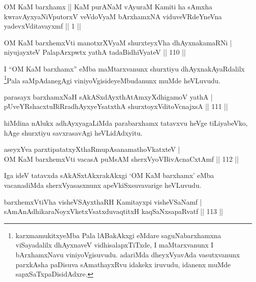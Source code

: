 \begin{shl}
OM KaM barxhamx || KaM purANaM vAyuraM Kamiti ha sAmxha kwravAyxyaNiVputorxV veVdoV\s yaM bArxhamxNA viduveVRdeYneVna yadevxVditavayxmf || 1 ||
\end{shl}

\centerline{}


\begin{shl}
OM KaM barxhemxVti manotxrXV\s yaM shurxteyxVha dhAyxnakamaRNi  | \\
niyujayxteV PalapArxpwtx yathA tadaBidhiVyateV \hfill||  110 ||  
\end{shl}

\begin{artha}
I ``OM KaM barxhamx'' eMba maMtarxvanunx shurxtiyu dhAyxnakAyaRdalilx \footnote{karxmamukitxyeMba Pala lABakAkxgi eMdare saguNabarxhamxna viSayadalilx dhAyxnaveV vidhisalapxTiTxde, I maMtarxvanunx I bArxhamxNavu viniyoVgisuvudu. adariMda dheyxVyavAda vasutxvanunx parxkAsha paDisuva sAmathayxRvu idakekx iruvudu, idanenx muMde sapxSaTxpaDisidAdxre.}Pala saMpAdanegAgi viniyoVgisideyeMbudanunx muMde heVLuvudu.
\end{artha}


\begin{shl}
parasayx barxhamxNaH sAkASxdAyxthAtAmxyXdhigamoV yathA  | \\
pUveYRshacxtuBiRradhAyxyeYsatxthA shurxtoyxVditoV\s cnajxsA \hfill||  111 ||  
\end{shl}

\begin{artha}
hiMdina nAlukx adhAyxyagaLiMda parabarxhamx tatavxvu heVge tiLiyabeVko, hAge shurxtiyu savxrasavAgi heVLidAdxyitu.
\end{artha}

\begin{shl}
aseyxYva parxtipatatxyXthaRmupAsanamathoVkatxteV  | \\
OM KaM barxhemxVti vacasA puMsAM sherxVyoVBivAcnaCxtAmf \hfill||  112 ||  
\end{shl}

\begin{artha}
Iga ideV tatavxda sAkASxtAkxrakAkxgi `OM KaM barxhamx' eMba vacanadiMda sherxVyasasxnunx apeVkiSxsuvavarige heVLuvudu.
\end{artha}

\begin{shl}
barxhemxVtiVha visheVSAyxthaRH Kamitayxpi visheVSaNamf  | \\
sAmAnAdhikaraNoyxVketxVsatxduvaqtitxH kaqSaNxsapaRvatf  \hfill||  113 ||  
\end{shl}

